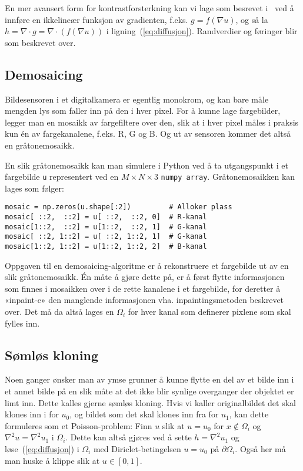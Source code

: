 \documentclass[11pt,a4paper]{article}
\begin{document}
En mer avansert form for kontrastforsterkning kan vi lage som besrevet
i~\cite{Fattal:02} ved å innføre en ikkelineær funksjon av gradienten,
f.eks. $g = f(\nabla u)$, og så la
$h = \nabla\cdot g = \nabla\cdot(f(\nabla u))$ i
ligning~(\ref{eq:diffusjon}). Randverdier og føringer blir som
beskrevet over.

\subsection{Demosaicing}
\label{sec:utvidelse_1}

Bildesensoren i et digitalkamera er egentlig monokrom, og kan bare
måle mengden lys som faller inn på den i hver pixel. For å kunne lage
fargebilder, legger man en mosaikk av fargefiltere over den, slik at i
hver pixel måles i praksis kun én av fargekanalene, f.eks. R, G og B.
Og ut av sensoren kommer det altså en gråtonemosaikk.

En slik gråtonemosaikk kan man simulere i Python ved å ta utgangspunkt
i et fargebilde \texttt{u} representert ved en $M\times N \times 3$
\texttt{numpy array}. Gråtonemosaikken kan lages som følger:
\begin{lstlisting}
mosaic = np.zeros(u.shape[:2])         # Alloker plass
mosaic[ ::2,  ::2] = u[ ::2,  ::2, 0]  # R-kanal
mosaic[1::2,  ::2] = u[1::2,  ::2, 1]  # G-kanal
mosaic[ ::2, 1::2] = u[ ::2, 1::2, 1]  # G-kanal
mosaic[1::2, 1::2] = u[1::2, 1::2, 2]  # B-kanal
\end{lstlisting}

Oppgaven til en demosaicing-algoritme er å rekonstruere et fargebilde
ut av en slik gråtonemosaikk. Én måte å gjøre dette på, er å først
flytte informasjonen som finnes i mosaikken over i de rette kanalene i
et fargebilde, for deretter å «inpaint-e» den manglende informasjonen
vha. inpaintingsmetoden beskrevet over. Det må da altså lages en
$\Omega_i$ for hver kanal som definerer pixlene som skal fylles inn.

\subsection{Sømløs kloning}

Noen ganger ønsker man av ymse grunner å kunne flytte en del av et
bilde inn i et annet bilde på en slik måte at det ikke blir synlige
overganger der objektet er limt inn. Dette kalles gjerne sømløs
kloning. Hvis vi kaller originalbildet det skal klones inn i for
$u_0$, og bildet som det skal klones inn fra for $u_1$, kan dette
formuleres som et Poisson-problem: Finn $u$ slik at $u = u_0$ for
$x \not\in \Omega_i$ og $\nabla^2 u = \nabla^2 u_1$ i $\Omega_i$.
Dette kan altså gjøres ved å sette $h = \nabla^2 u_1$ og
løse~(\ref{eq:diffusjon}) i $\Omega_i$ med Diriclet-betingelsen
$u = u_0$ på $\partial\Omega_i$. Også her må man huske å klippe slik
at $u \in [0, 1]$.
\end{document}
